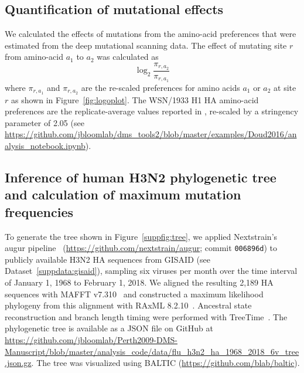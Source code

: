 \documentclass[9pt,twocolumn,twoside]{pnas-new}
\begin{document}
{\subsection*{Quantification of mutational effects}
We calculated the effects of mutations from the amino-acid preferences that were estimated from the deep mutational scanning data.
The effect of mutating site $r$ from amino-acid $a_1$ to $a_2$ was calculated as
\begin{equation}
\label{eq:muteffect}
\log_2 \frac{\pi_{r,a_2}}{\pi_{r,a_1}}
\end{equation}
where $\pi_{r,a_1}$ and $\pi_{r,a_2}$ are the re-scaled preferences for amino acids $a_1$ or $a_2$ at site $r$ as shown in Figure~\ref{fig:logoplot}.
The WSN/1933 H1 HA amino-acid preferences are the replicate-average values reported in \cite{doud2016accurate}, re-scaled by a stringency parameter of 2.05 (see \url{https://github.com/jbloomlab/dms_tools2/blob/master/examples/Doud2016/analysis_notebook.ipynb}).

\subsection*{Inference of human H3N2 phylogenetic tree and calculation of maximum mutation frequencies}
To generate the tree shown in Figure~\ref{suppfig:tree}, we applied Nextstrain's augur pipeline~\cite{Hadfield224048} (\url{https://github.com/nextstrain/augur}; commit \texttt{006896d}) to publicly available H3N2 HA sequences from GISAID \cite{shu2017gisaid} (see Dataset~\ref{suppdata:gisaid}), sampling six viruses per month over the time interval of January 1, 1968 to February 1, 2018.
We aligned the resulting 2,189 HA sequences with MAFFT v7.310~\cite{katoh2013mafft} and constructed a maximum likelihood phylogeny from this alignment with RAxML 8.2.10~\cite{stamatakis2006raxml}.
Ancestral state reconstruction and branch length timing were performed with TreeTime~\cite{Sagulenko2018}.
The phylogenetic tree is available as a JSON file on GitHub at \url{https://github.com/jbloomlab/Perth2009-DMS-Manuscript/blob/master/analysis_code/data/flu_h3n2_ha_1968_2018_6v_tree.json.gz}.
The tree was visualized using BALTIC (\url{https://github.com/blab/baltic}).

\newcommand{\dx}{\mathrm{d}x}						%
\newcommand{\dy}{\mathrm{d}y}						%
\newcommand{\dt}{\mathrm{d}t}						%
\newcommand{\inertia}{\epsilon}			    %
\newcommand{\normal}{\mathcal{N}}				%

}
\end{document}
